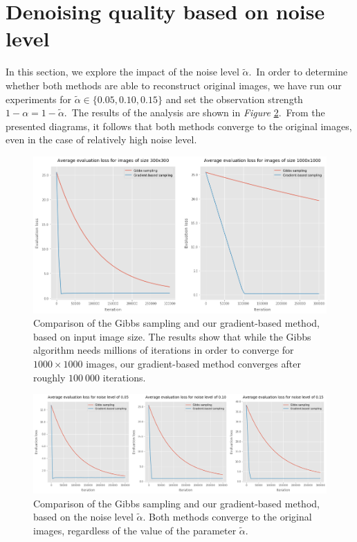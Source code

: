 \documentclass[shortabstract, english, lic]{iithesis}
\theoremstyle{default_theorem_style}\newtheorem{theorem}{Theorem}
\theoremstyle{default_theorem_style}\newtheorem{definition}{Definition}
\begin{document}
\section{Denoising quality based on noise level}

In this section, we explore the impact of the noise level $\tilde{\alpha}$.\ In order to determine whether both
methods are able to reconstruct original images, we have run our experiments for
$\tilde{\alpha} \in \{0.05, 0.10, 0.15\}$ and set the observation strength $1 - \alpha = 1 - \tilde{\alpha}$.\ The
results of the analysis are shown in \textit{Figure} \ref{fig:binary_noise_level_plots}.\ From the presented
diagrams, it follows that both methods converge to the original images, even in the case of relatively high noise
level.\newline\newline\newline\newline

\begin{figure}[H]
\centering
\includegraphics[scale=0.38]{binary_input_size_plots}
\caption{Comparison of the Gibbs sampling and our gradient-based method, based on input image size. The results
show that while the Gibbs algorithm needs millions of iterations in order to converge for $1000{\times}1000$ images, our
gradient-based method converges after roughly $100\ 000$ iterations.}
\label{fig:binary_input_size_plots}
\end{figure}

\begin{figure}[H]
\centering
\includegraphics[scale=0.35]{binary_noise_level_plots}
\caption{Comparison of the Gibbs sampling and our gradient-based method, based on the noise level
$\tilde{\alpha}$. Both methods converge to the original images, regardless of the value of
the parameter $\tilde{\alpha}$.}
\label{fig:binary_noise_level_plots}
\end{figure}
\end{document}

